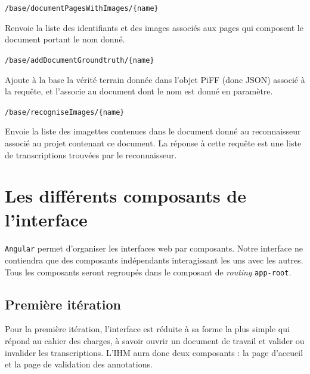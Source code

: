 \begin{description}[align=left]
\item [GET] \texttt{/base/documentPagesWithImages/\{name\}}\newline{}
\begin{itshape}
Renvoie la liste des identifiants et des images associés aux pages qui composent le document portant le nom donné.
\end{itshape}

\item [POST] \texttt{/base/addDocumentGroundtruth/\{name\}}\newline{}
\begin{itshape}
Ajoute à la base la vérité terrain donnée dans l'objet PiFF (donc JSON) associé à la requête, et l'associe au document dont le nom est donné en paramètre.
\end{itshape}

\item [GET] \texttt{/base/recogniseImages/\{name\}}\newline{}
\begin{itshape}
Envoie la liste des imagettes contenues dans le document donné au reconnaisseur associé au projet contenant ce document. La réponse à cette requête est une liste de transcriptions trouvées par le reconnaisseur.
\end{itshape}

\end{description}


\section{Les différents composants de l'interface}

\paragraph{}
\texttt{Angular} permet d'organiser les interfaces web par composants. Notre interface ne contiendra que des composants indépendants interagissant les uns avec les autres. Tous les composants seront regroupés dans le composant de \textit{routing} \texttt{app-root}.

\subsection{Première itération}

Pour la première itération, l’interface est réduite à sa forme la plus simple qui répond au cahier des charges, à savoir ouvrir un document de travail et valider ou invalider les transcriptions. L’IHM aura donc deux composants : la page d’accueil et la page de validation des annotations.

